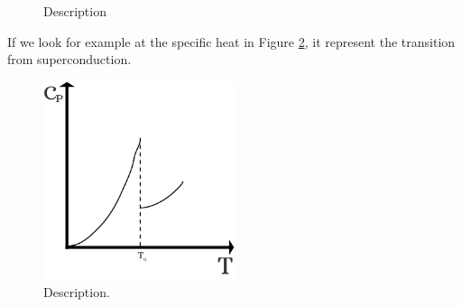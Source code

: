 \documentclass[../main/main.tex]{subfiles}
\begin{document}
\begin{figure}[h!]
\begin{minipage}[]{0.3\linewidth}
\centering
{}
\end{minipage}
\caption{\label{fig:2_5} Description}
\end{figure}

If we look for example at the specific heat in Figure \ref{fig:2_6}, it represent the transition from superconduction.
\begin{figure}[h!]
\centering
\includegraphics[width=0.5\textwidth]{../lessons/2_image/8.pdf}
\caption{\label{fig:2_6} Description.}
\end{figure}
\end{document}
